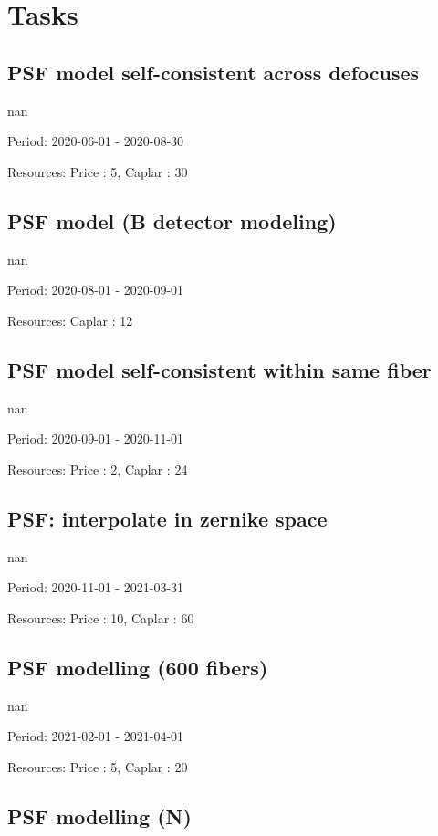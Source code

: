\section{Tasks}\subsection{PSF model self-consistent across defocuses}

nan

Period: 2020-06-01 - 2020-08-30

Resources: Price : 5, Caplar : 30

\subsection{PSF model (B detector modeling)}

nan

Period: 2020-08-01 - 2020-09-01

Resources: Caplar : 12

\subsection{PSF model self-consistent within same fiber}

nan

Period: 2020-09-01 - 2020-11-01

Resources: Price : 2, Caplar : 24

\subsection{PSF: interpolate in zernike space}

nan

Period: 2020-11-01 - 2021-03-31

Resources: Price : 10, Caplar : 60

\subsection{PSF modelling (600 fibers)}

nan

Period: 2021-02-01 - 2021-04-01

Resources: Price : 5, Caplar : 20

\subsection{PSF modelling (N)}

